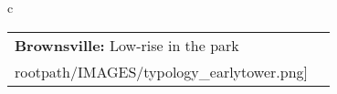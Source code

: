 \begin{table}[H]
        \begin{tabular}{c}
        \begin{tabular}{m{1.5in} m{2in}}
\textbf{Brownsville:} {Low-rise in the park} & \texttt{[image: \\rootpath/IMAGES/typology\_earlytower.png]}
\end{tabular}\end{tabular}
        \end{table}